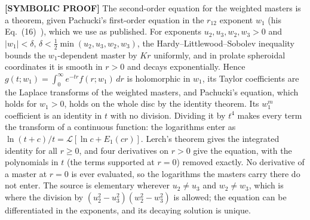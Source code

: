 \textbf{[SYMBOLIC PROOF]} The second-order equation for the weighted masters
is a theorem, given Pachucki's first-order equation in the $r_{12}$
exponent $w_1$ (his Eq.~(16)~\cite{pachucki2009}), which we use as
published.  For exponents $u_2,u_3,w_2,w_3>0$ and $|w_1|<\delta$,
$\delta<\tfrac12\min(u_2,u_3,w_2,w_3)$, the Hardy--Littlewood--Sobolev
inequality bounds the $w_1$-dependent master by $Kr$ uniformly, and in
prolate spheroidal coordinates it is smooth in $r>0$ and decays
exponentially.  Hence $g(t;w_1)=\int_0^\infty e^{-tr}f(r;w_1)\,dr$ is
holomorphic in $w_1$, its Taylor coefficients are the Laplace transforms
of the weighted masters, and Pachucki's equation, which holds for $w_1>0$,
holds on the whole disc by the identity theorem.  Its $w_1^m$ coefficient
is an identity in $t$ with no division.  Dividing it by $t^4$ makes every
term the transform of a continuous function: the logarithms enter as
$\ln(t+c)/t=\mathcal{L}[\ln c+E_1(cr)]$.  Lerch's theorem gives the
integrated identity for all $r\ge0$, and four derivatives on $r>0$ give the
equation, with the polynomials in $t$ (the terms supported at $r=0$)
removed exactly.  No derivative of a master at $r=0$ is ever evaluated, so
the logarithms the masters carry there do not enter.  The source is
elementary wherever $u_2\neq u_3$ and $w_2\neq w_3$, which is where the
division by $(u_2^2-u_3^2)(w_2^2-w_3^2)$ is allowed; the equation can be
differentiated in the exponents, and its decaying solution is unique.
